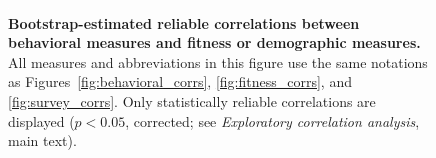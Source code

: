 \documentclass[10pt]{article}
\begin{document}
\begin{figure}
\centering
\includegraphics[width=\textwidth]{figs/behavior_fitness+survey_correlations}
\caption{\textbf{Bootstrap-estimated reliable correlations between
    behavioral measures and fitness or demographic measures.}  All
  measures and abbreviations in this figure use the same notations as
  Figures~\ref{fig:behavioral_corrs}, \ref{fig:fitness_corrs}, and
  \ref{fig:survey_corrs}.  Only statistically reliable correlations are
displayed ($p < 0.05$, corrected; see \textit{Exploratory correlation
  analysis}, main text).}
\label{fig:fitness_survey_corrs}
\end{figure}
\end{document}
